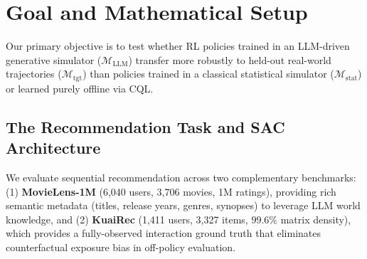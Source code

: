 \documentclass{article}
\begin{document}
\section{Goal and Mathematical Setup}
Our primary objective is to test whether RL policies trained in an LLM-driven generative simulator ($\mathcal{M}_{\text{LLM}}$) transfer more robustly to held-out real-world trajectories ($\mathcal{M}_{\text{tgt}}$) than policies trained in a classical statistical simulator ($\mathcal{M}_{\text{stat}}$) or learned purely offline via CQL.

\subsection{The Recommendation Task and SAC Architecture}
We evaluate sequential recommendation across two complementary benchmarks: (1) \textbf{MovieLens-1M} (6,040 users, 3,706 movies, 1M ratings), providing rich semantic metadata (titles, release years, genres, synopses) to leverage LLM world knowledge, and (2) \textbf{KuaiRec} \cite{gao2022kuairec} (1,411 users, 3,327 items, $99.6\%$ matrix density), which provides a fully-observed interaction ground truth that eliminates counterfactual exposure bias in off-policy evaluation.
\end{document}
